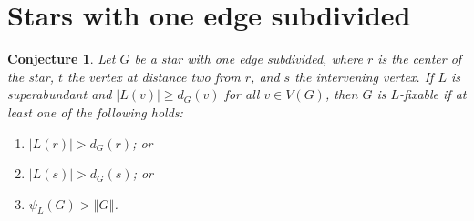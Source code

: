 \documentclass[12pt]{article}
\theoremstyle{plain}
\newtheorem{conjecture}[thm]{Conjecture}
\theoremstyle{definition}
\theoremstyle{remark}
\newcommand{\size}[1]{\left\Vert#1\right\Vert}
\begin{document}
\section{Stars with one edge subdivided}
\begin{conjecture}
	\label{StarWithOneEdgeSubdivided}
	Let $G$ be a star with one edge subdivided, where $r$ is the center of the
	star, $t$ the vertex at distance two from $r$, and $s$ the intervening vertex.  
	If $L$ is superabundant and $|L(v)| \ge d_G(v)$ for all 
	$v \in V(G)$, then $G$ is $L$-fixable if at least one of the following holds:
	\begin{enumerate}
		\item[(a)] $|L(r)| > d_G(r)$; or
		\item[(b)] $|L(s)| > d_G(s)$; or
		\item[(c)] $\psi_L(G) > \size{G}$.
	\end{enumerate}
\end{conjecture}
\end{document}
